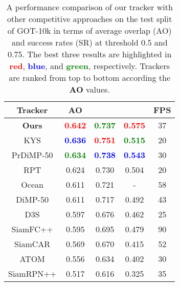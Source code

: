 \documentclass[final]{cvpr}
\begin{document}
\begin{table}[!tbp]
 \centering
 \caption{\label{tab:got10k_tab}A performance comparison of our tracker with other competitive approaches on the test split of GOT-10k in terms of average overlap (AO) and success rates (SR) at threshold 0.5 and 0.75. The best three results are highlighted in \textcolor{red}{\textbf{red}}, \textcolor{blue}{\textbf{blue}}, and \textcolor{green}{\textbf{green}}, respectively. Trackers are ranked from top to bottom according the \textbf{AO} values.}
 \vspace{-1.0em}
 \begin{tabular}{cccc|c}
  \toprule
  \textbf{Tracker} & \textbf{AO} &  &  & \textbf{FPS}\\
  \midrule
  \textbf{Ours} & \textcolor{red}{\textbf{0.642}} & \textcolor{green}{\textbf{0.737}} & \textcolor{red}{\textbf{0.575}} & 37 \\
  KYS \cite{bhat2020know} & \textcolor{blue}{\textbf{0.636}} & \textcolor{red}{\textbf{0.751}} & \textcolor{green}{\textbf{0.515}} & 20 \\
  PrDiMP-50 \cite{danelljan2020probabilistic} & \textcolor{green}{\textbf{0.634}} & \textcolor{blue}{\textbf{0.738}} & \textcolor{blue}{\textbf{0.543}} & 30 \\
  RPT \cite{ma2020rpt} & 0.624 & 0.730 & 0.504 & 20 \\
  Ocean \cite{zhang2020ocean} & 0.611 & 0.721 & - & 58 \\
  DiMP-50 \cite{bhat2019learning} & 0.611 & 0.717 & 0.492 & 43 \\
  D3S \cite{lukezic2020d3s} & 0.597 & 0.676 & 0.462 & 25 \\
  SiamFC++ \cite{xu2020siamfc++} & 0.595 & 0.695 & 0.479 & 90 \\
  SiamCAR \cite{guo2020siamcar} & 0.569 & 0.670 & 0.415 & 52 \\
  ATOM \cite{danelljan2019atom} & 0.556 & 0.634 & 0.402 & 30 \\
  SiamRPN++ \cite{li2019siamrpn++} & 0.517 & 0.616 & 0.325 & 35 \\
  \bottomrule
 \end{tabular}
 \vspace{-1.0em}
\end{table}
\end{document}
